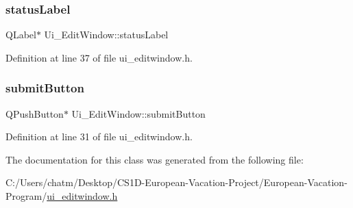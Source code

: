 \subsubsection{\texorpdfstring{statusLabel}{statusLabel}}
{\footnotesize\ttfamily Q\+Label$\ast$ Ui\+\_\+\+Edit\+Window\+::status\+Label}



Definition at line 37 of file ui\+\_\+editwindow.\+h.

\mbox{\label{class_ui___edit_window_acb1a4bc3d3ca7ac89aadec3fd0d8136e}} 
\subsubsection{\texorpdfstring{submitButton}{submitButton}}
{\footnotesize\ttfamily Q\+Push\+Button$\ast$ Ui\+\_\+\+Edit\+Window\+::submit\+Button}



Definition at line 31 of file ui\+\_\+editwindow.\+h.



The documentation for this class was generated from the following file\+:\begin{DoxyCompactItemize}
\item 
C\+:/\+Users/chatm/\+Desktop/\+C\+S1\+D-\/\+European-\/\+Vacation-\/\+Project/\+European-\/\+Vacation-\/\+Program/\mbox{\hyperlink{ui__editwindow_8h}{ui\+\_\+editwindow.\+h}}\end{DoxyCompactItemize}
